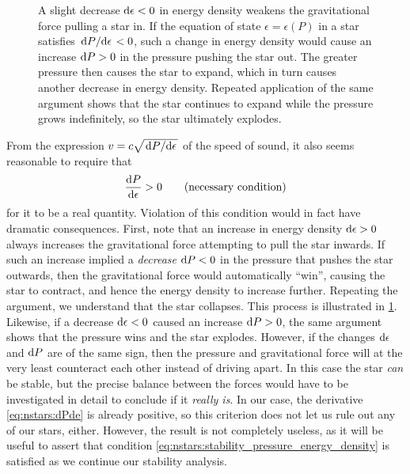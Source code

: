 \begin{figure}
\caption{\label{fig:nstars:star_explosion}%
A slight decrease $\mathop{}\!\mathrm{d} \epsilon < 0$ in energy density weakens the gravitational force pulling a star in.
If the equation of state $\epsilon = \epsilon(P)$ in a star satisfies $\odv{P}/{\epsilon} < 0$, such a change in energy density would cause an increase $\mathop{}\!\mathrm{d} P > 0$ in the pressure pushing the star out.
The greater pressure then causes the star to expand, which in turn causes another decrease in energy density.
Repeated application of the same argument shows that the star continues to expand while the pressure grows indefinitely, so the star ultimately explodes.
}
\end{figure}

From the expression $v = c \sqrt{\odv{P}/{\epsilon}}$ of the speed of sound, it also seems reasonable to require that
\begin{equation}
	\odv{P}{\epsilon} > 0
	\qquad \text{(necessary condition)}
\label{eq:nstars:stability_pressure_energy_density}
\end{equation}
for it to be a real quantity.
Violation of this condition would in fact have dramatic consequences.
First, note that an increase in energy density $\mathop{}\!\mathrm{d} \epsilon > 0$ always increases the gravitational force attempting to pull the star inwards.
If such an increase implied a \emph{decrease} $\mathop{}\!\mathrm{d} P < 0$ in the pressure that pushes the star outwards, then the gravitational force would automatically ``win'', causing the star to contract, and hence the energy density to increase further.
Repeating the argument, we understand that the star collapses.
This process is illustrated in \cref{fig:nstars:star_explosion}.
Likewise, if a decrease $\mathop{}\!\mathrm{d} \epsilon < 0$ caused an increase $\mathop{}\!\mathrm{d} P > 0$, the same argument shows that the pressure wins and the star explodes.
However, if the changes $\mathop{}\!\mathrm{d} \epsilon$ and $\mathop{}\!\mathrm{d} P$ are of the same sign, then the pressure and gravitational force will at the very least counteract each other instead of driving apart.
In this case the star \emph{can} be stable, but the precise balance between the forces would have to be investigated in detail to conclude if it \emph{really is}.
In our case, the derivative \eqref{eq:nstars:dPde} is already positive, so this criterion does not let us rule out any of our stars, either.
However, the result is not completely useless, as it will be useful to assert that condition \eqref{eq:nstars:stability_pressure_energy_density} is satisfied as we continue our stability analysis.

